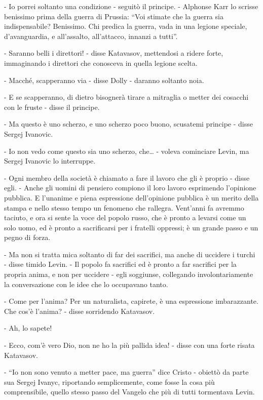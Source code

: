 - Io porrei soltanto una condizione - seguitò il principe. - Alphonse Karr lo scrisse benissimo prima della guerra di Prussia: ``Voi stimate che la guerra sia indispensabile? Benissimo. Chi predica la guerra, vada in una legione speciale, d'avanguardia, e all'assalto, all'attacco, innanzi a tutti''. 

- Saranno belli i direttori! - disse Katavasov, mettendosi a ridere forte, immaginando i direttori che conosceva in quella legione scelta. 

- Macché, scapperanno via - disse Dolly - daranno soltanto noia. 

- E se scapperanno, di dietro bisognerà tirare a mitraglia o metter dei cosacchi con le fruste - disse il principe. 

- Ma questo è uno scherzo, e uno scherzo poco buono, scusatemi principe - disse Sergej Ivanovic. 

- Io non vedo come questo sia uno scherzo, che\ldots{} - voleva cominciare Levin, ma Sergej Ivanovic lo interruppe. 

- Ogni membro della società è chiamato a fare il lavoro che gli è proprio - disse egli. - Anche gli uomini di pensiero compiono il loro lavoro esprimendo l'opinione pubblica. E l'unanime e piena espressione dell'opinione pubblica è un merito della stampa e nello stesso tempo un fenomeno che rallegra. Vent'anni fa avremmo taciuto, e ora si sente la voce del popolo russo, che è pronto a levarsi come un solo uomo, ed è pronto a sacrificarsi per i fratelli oppressi; è un grande passo e un pegno di forza. 

- Ma non si tratta mica soltanto di far dei sacrifici, ma anche di uccidere i turchi - disse timido Levin. - Il popolo fa sacrifici ed è pronto a far sacrifici per la propria anima, e non per uccidere - egli soggiunse, collegando involontariamente la conversazione con le idee che lo occupavano tanto. 

- Come per l'anima? Per un naturalista, capirete, è una espressione imbarazzante. Che cos'è l'anima? - disse sorridendo Katavasov. 

- Ah, lo sapete! 

- Ecco, com'è vero Dio, non ne ho la più pallida idea! - disse con una forte risata Katavasov. 

- ``Io non sono venuto a metter pace, ma guerra'' dice Cristo - obiettò da parte sua Sergej Ivanyc, riportando semplicemente, come fosse la cosa più comprensibile, quello stesso passo del Vangelo che più di tutti tormentava Levin. 

